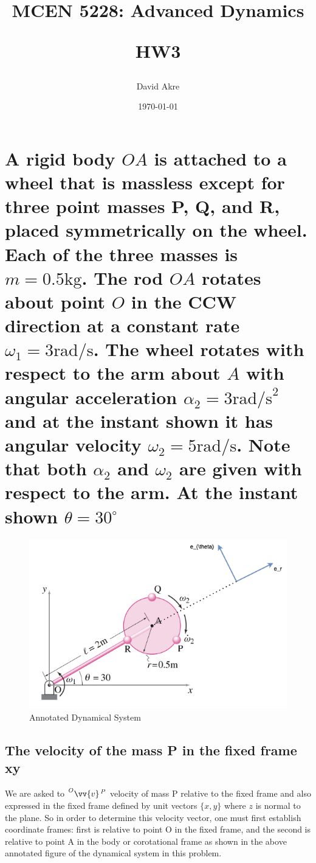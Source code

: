 \documentclass{article}
\title{MCEN 5228: Advanced Dynamics

HW3}
\author{David Akre}
\date{\today}
\begin{document}
\maketitle

\section{A rigid body $OA$ is attached to a wheel that is massless except for three point masses P, Q, and R, placed symmetrically on the wheel. Each of the three masses is $m = 0.5\text{kg}$. The rod $OA$ rotates about point $O$ in the CCW direction at a constant rate $\omega_1 = 3\text{rad/s}$. The wheel rotates with respect to the arm about $A$ with angular acceleration $\alpha_2 = 3\text{rad/s}^2$ and at the instant shown it has angular velocity $\omega_2 = 5\text{rad/s}$. Note that both $\alpha_2$ and $\omega_2$ are given with respect to the arm. At the instant shown $\theta = 30^\circ$}

\begin{figure}[H]
    \centering
    \includegraphics[width=\linewidth]{hw3.png}
    \caption{Annotated Dynamical System}
\end{figure}

\subsection{The velocity of the mass P in the fixed frame xy}

We are asked to $\prescript{O}{}{\vv{v}}^{\, P}$ velocity of mass P relative to the fixed frame and also expressed in the fixed frame defined by unit vectors $\{x, y\}$ where $z$ is normal to the plane. So in order to determine this velocity vector, one must first establish coordinate frames: first is relative to point O in the fixed frame, and the second is relative to point A in the body or corotational frame as shown in the above annotated figure of the dynamical system in this problem.
\end{document}
